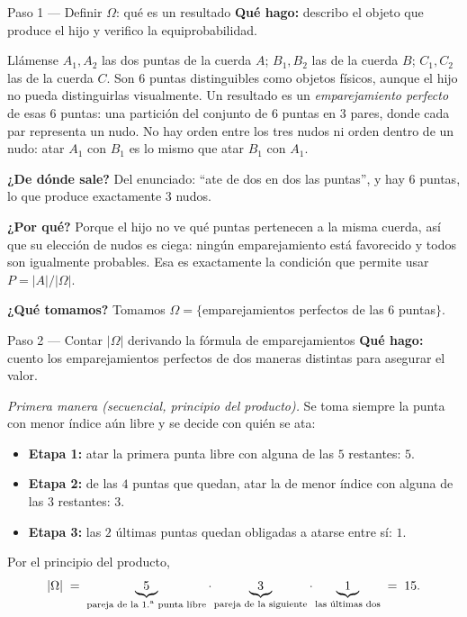 \documentclass[11pt]{article}
\begin{document}
\begin{sol}

\begin{paso}{Paso 1 --- Definir $\Omega$: qu\'e es un resultado}
\textbf{Qu\'e hago:} describo el objeto que produce el hijo y verifico la equiprobabilidad.

Ll\'amense $A_1,A_2$ las dos puntas de la cuerda $A$; $B_1,B_2$ las de la cuerda $B$; $C_1,C_2$ las de la cuerda $C$. Son $6$ puntas distinguibles como objetos f\'isicos, aunque el hijo no pueda distinguirlas visualmente. Un resultado es un \emph{emparejamiento perfecto} de esas $6$ puntas: una partici\'on del conjunto de $6$ puntas en $3$ pares, donde cada par representa un nudo. No hay orden entre los tres nudos ni orden dentro de un nudo: atar $A_1$ con $B_1$ es lo mismo que atar $B_1$ con $A_1$.

\textbf{¿De d\'onde sale?} Del enunciado: ``ate de dos en dos las puntas'', y hay $6$ puntas, lo que produce exactamente $3$ nudos.

\textbf{¿Por qu\'e?} Porque el hijo no ve qu\'e puntas pertenecen a la misma cuerda, as\'i que su elecci\'on de nudos es ciega: ning\'un emparejamiento est\'a favorecido y todos son igualmente probables. Esa es exactamente la condici\'on que permite usar $P=|A|/|\Omega|$.

\textbf{¿Qu\'e tomamos?} Tomamos $\Omega=\{$emparejamientos perfectos de las $6$ puntas$\}$.
\end{paso}

\begin{paso}{Paso 2 --- Contar $|\Omega|$ derivando la f\'ormula de emparejamientos}
\textbf{Qu\'e hago:} cuento los emparejamientos perfectos de dos maneras distintas para asegurar el valor.

\emph{Primera manera (secuencial, principio del producto).} Se toma siempre la punta con menor \'indice a\'un libre y se decide con qui\'en se ata:
\begin{itemize}[leftmargin=*]
  \item \textbf{Etapa 1:} atar la primera punta libre con alguna de las $5$ restantes: $5$.
  \item \textbf{Etapa 2:} de las $4$ puntas que quedan, atar la de menor \'indice con alguna de las $3$ restantes: $3$.
  \item \textbf{Etapa 3:} las $2$ \'ultimas puntas quedan obligadas a atarse entre s\'i: $1$.
\end{itemize}
Por el principio del producto,
\[
|\Omega| \;=\; \underbrace{5}_{\text{pareja de la 1.\textsuperscript{a} punta libre}}\cdot\underbrace{3}_{\text{pareja de la siguiente}}\cdot\underbrace{1}_{\text{las \'ultimas dos}} \;=\; 15 .
\]


\end{paso}
\end{sol}
\end{document}
